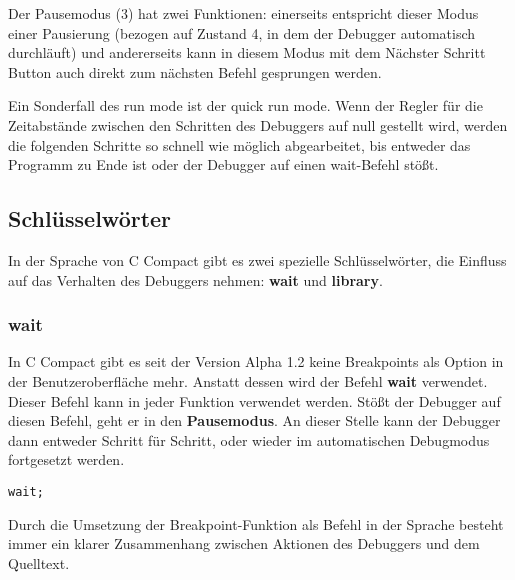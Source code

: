 
Der Pausemodus (3) hat zwei Funktionen: einerseits entspricht dieser Modus einer Pausierung (bezogen auf Zustand 4, in dem der Debugger automatisch durchläuft) und andererseits kann in diesem Modus mit dem \glqq{}Nächster Schritt\grqq{} Button auch direkt zum nächsten Befehl gesprungen werden.

Ein Sonderfall des run mode ist der \glqq{}quick run mode\grqq{}. Wenn der Regler für die Zeitabstände zwischen den Schritten des Debuggers auf null gestellt wird, werden die folgenden Schritte so schnell wie möglich abgearbeitet, bis entweder das Programm zu Ende ist oder der Debugger auf einen \glqq{}wait\grqq{}-Befehl stößt.


\subsection{Schlüsselwörter}
\label{sec:deb-keywords}
In der Sprache von C Compact gibt es zwei spezielle Schlüsselwörter, die Einfluss auf das Verhalten des Debuggers nehmen: \textbf{wait} und \textbf{library}.

\subsubsection*{wait}
In C Compact gibt es seit der Version Alpha 1.2 keine Breakpoints als Option in der Benutzeroberfläche mehr. Anstatt dessen wird der Befehl \textbf{wait} verwendet. Dieser Befehl kann in jeder Funktion verwendet werden. Stößt der Debugger auf diesen Befehl, geht er in den \textbf{Pausemodus}. An dieser Stelle kann der Debugger dann entweder Schritt für Schritt, oder wieder im automatischen Debugmodus fortgesetzt werden.

\begin{lstlisting}[language=CMM]
wait;
\end{lstlisting}

Durch die Umsetzung der Breakpoint-Funktion als Befehl in der Sprache besteht immer ein klarer Zusammenhang zwischen Aktionen des Debuggers und dem Quelltext.


